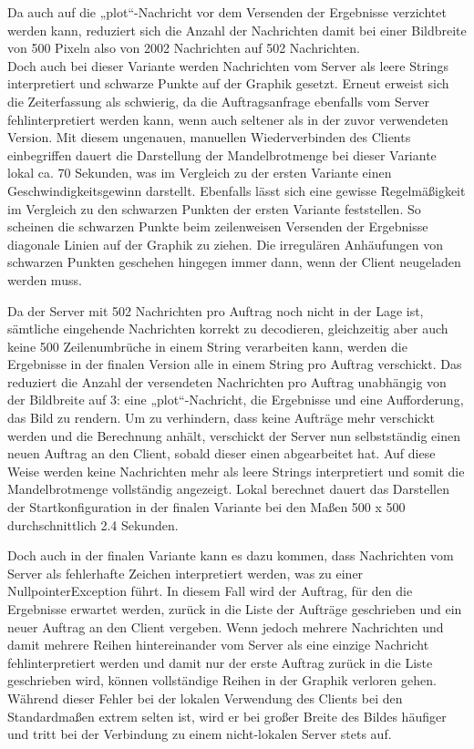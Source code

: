 \documentclass[12pt, onecolumn, notitlepage]{scrartcl}
\begin{document}
Da auch auf die „plot“-Nachricht vor dem Versenden der Ergebnisse verzichtet werden kann, reduziert sich die Anzahl der Nachrichten damit bei einer Bildbreite von 500 Pixeln also von 2002 Nachrichten auf 502 Nachrichten.\\
Doch auch bei dieser Variante werden Nachrichten vom Server als leere Strings interpretiert und schwarze Punkte auf der Graphik gesetzt. Erneut erweist sich die Zeiterfassung als schwierig, da die Auftragsanfrage ebenfalls vom Server fehlinterpretiert werden kann, wenn auch seltener als in der zuvor verwendeten Version. Mit diesem ungenauen, manuellen Wiederverbinden des Clients einbegriffen dauert die Darstellung der Mandelbrotmenge bei dieser Variante lokal ca. 70 Sekunden, was im Vergleich zu der ersten Variante einen Geschwindigkeitsgewinn darstellt. Ebenfalls lässt sich eine gewisse Regelmäßigkeit im Vergleich zu den schwarzen Punkten der ersten Variante feststellen. So scheinen die schwarzen Punkte beim zeilenweisen Versenden der Ergebnisse  diagonale Linien auf der Graphik zu ziehen. Die irregulären Anhäufungen von schwarzen Punkten geschehen hingegen immer dann, wenn der Client neugeladen werden muss. \par
Da der Server mit 502 Nachrichten pro Auftrag noch nicht in der Lage ist, sämtliche eingehende Nachrichten korrekt zu decodieren, gleichzeitig aber auch keine 500 Zeilenumbrüche in einem String verarbeiten kann, werden die Ergebnisse in der finalen Version alle in einem String pro Auftrag verschickt. Das reduziert die Anzahl der versendeten Nachrichten pro Auftrag unabhängig von der Bildbreite auf 3: eine „plot“-Nachricht, die Ergebnisse und eine Aufforderung, das Bild zu rendern. Um zu verhindern, dass keine Aufträge mehr verschickt werden und die Berechnung anhält, verschickt der Server nun selbstständig einen neuen Auftrag an den Client, sobald dieser einen abgearbeitet hat. Auf diese Weise werden keine Nachrichten mehr als leere Strings interpretiert und somit die Mandelbrotmenge vollständig angezeigt. Lokal berechnet dauert das Darstellen der Startkonfiguration in der finalen Variante bei den Maßen 500 x 500 durchschnittlich 2.4 Sekunden.\par

Doch auch in der finalen Variante kann es dazu kommen, dass Nachrichten vom Server als fehlerhafte Zeichen interpretiert werden, was zu einer NullpointerException führt. In diesem Fall wird der Auftrag, für den die Ergebnisse erwartet werden, zurück in die Liste der Aufträge geschrieben und ein neuer Auftrag an den Client vergeben. Wenn jedoch mehrere Nachrichten und damit mehrere Reihen hintereinander vom Server als eine einzige Nachricht fehlinterpretiert werden und damit nur der erste Auftrag zurück in die Liste geschrieben wird, können vollständige Reihen in der Graphik verloren gehen. Während dieser Fehler bei der lokalen Verwendung des Clients bei den Standardmaßen extrem selten ist, wird er bei großer Breite des Bildes häufiger und tritt bei der Verbindung zu einem nicht-lokalen Server stets auf.
\end{document}
